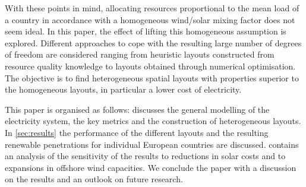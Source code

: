 \documentclass[a4paper, 5p, sort&compress]{elsarticle}%
\begin{document}
With these points in mind, allocating resources proportional to the
mean load of a country in accordance with a homogeneous wind/solar
mixing factor does not seem ideal. In this paper, the effect of
lifting this homogeneous assumption is explored. Different approaches
to cope with the resulting large number of degrees of freedom are
considered ranging from heuristic layouts constructed from resource
quality knowledge to layouts obtained through numerical
optimisation. The objective is to find heterogeneous spatial layouts
with properties superior to the homogeneous layouts, in particular a
lower cost of electricity.




This paper is organised as follows:  discusses the
general modelling of the electricity system, the key metrics and the
construction of heterogeneous layouts. In \cref{sec:results} the
performance of the different layouts and the resulting renewable
penetrations for individual European countries are
discussed.  contains an analysis of the
sensitivity of the results to reductions in solar costs and to
expansions in offshore wind capacities. We conclude the paper with a
discussion on the results and an outlook on future research.
\end{document}

